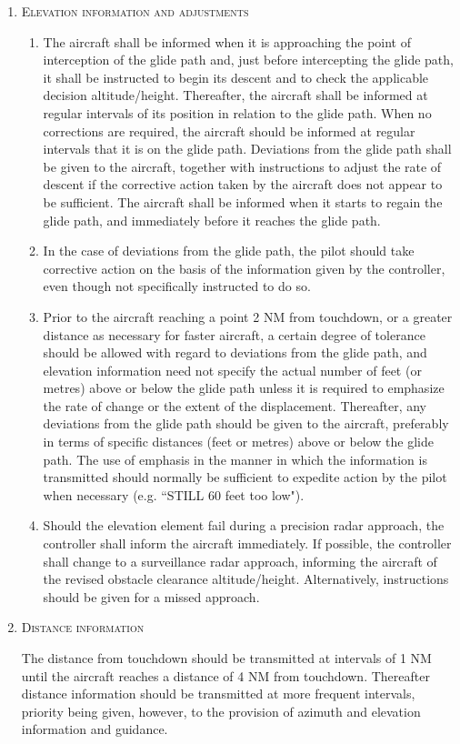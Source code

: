 \begin{enumeratesc}
\begin{enumerate}[labelindent=0pt,itemsep=0.2cm]
        \item \textsc{Elevation information and adjustments}
        \begin{enumerate}
            \item The aircraft shall be informed when it is approaching the point of interception of the glide path and, just before intercepting the glide path, it shall be instructed to begin its descent and to check the applicable decision altitude/height. Thereafter, the aircraft shall be informed at regular intervals of its position in relation to the glide path. When no corrections are required, the aircraft should be informed at regular intervals that it is on the glide path. Deviations from the glide path shall be given to the aircraft, together with instructions to adjust the rate of descent if the corrective action taken by the aircraft does not appear to be sufficient. The aircraft shall be informed when it starts to regain the glide path, and immediately before it reaches the glide path.
            \item In the case of deviations from the glide path, the pilot should take corrective action on the basis of the information given by the controller, even though not specifically instructed to do so.
            \item Prior to the aircraft reaching a point 2 NM from touchdown, or a greater distance as necessary for faster aircraft, a certain degree of tolerance should be allowed with regard to deviations from the glide path, and elevation information need not specify the actual number of feet (or metres) above or below the glide path unless it is required to emphasize the rate of change or the extent of the displacement. Thereafter, any deviations from the glide path should be given to the aircraft, preferably in terms of specific distances (feet or metres) above or below the glide path. The use of emphasis in the manner in which the information is transmitted should normally be sufficient to expedite action by the pilot when necessary (e.g. ``STILL 60 feet too low").
            \item Should the elevation element fail during a precision radar approach, the controller shall inform the aircraft immediately. If possible, the controller shall change to a surveillance radar approach, informing the aircraft of the revised obstacle clearance altitude/height. Alternatively, instructions should be given for a missed approach.
        \end{enumerate}

        \item \textsc{Distance information}
        \par\noindent The distance from touchdown should be transmitted at intervals of 1 NM until the aircraft reaches a distance of 4 NM from touchdown. Thereafter distance information should be transmitted at more frequent intervals, priority being given, however, to the provision of azimuth and elevation information and guidance.


\end{enumerate}
\end{enumeratesc}
